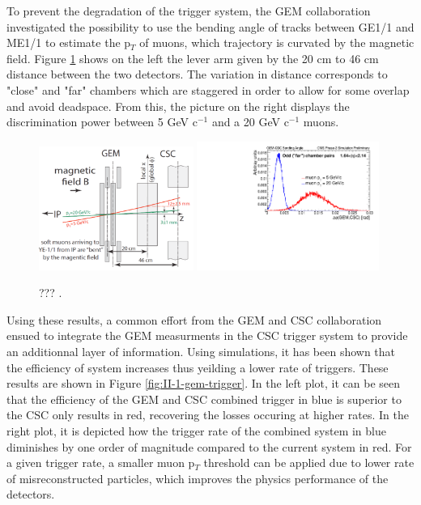     To prevent the degradation of the trigger system, the GEM collaboration investigated the possibility to use the bending angle of tracks between GE1/1 and ME1/1 to estimate the p$_T$ of muons, which trajectory is curvated by the magnetic field. Figure \ref{fig:II-1-gem-csc-bending} shows on the left the lever arm given by the 20 cm to 46 cm distance between the two detectors. The variation in distance corresponds to "close" and "far" chambers which are staggered in order to allow for some overlap and avoid deadspace. From this, the picture on the right displays the discrimination power between 5 GeV c$^{-1}$ and a 20 GeV c$^{-1}$ muons. \\

    \begin{figure}[h!]
      \centering
      \includegraphics[width=0.45\textwidth]{img/II-1-gem/gem-csc-bending-1.png}
      \includegraphics[width=0.53\textwidth]{img/II-1-gem/gem-csc-bending-2.pdf}
      \caption{??? \cite{Colaleo:2021453}.}
      \label{fig:II-1-gem-csc-bending}
    \end{figure}

    Using these results, a common effort from the GEM and CSC collaboration ensued to integrate the GEM measurments in the CSC trigger system to provide an additionnal layer of information. Using simulations, it has been shown that the efficiency of system increases thus yeilding a lower rate of triggers. These results are shown in Figure \ref{fig:II-1-gem-trigger}. In the left plot, it can be seen that the efficiency of the GEM and CSC combined trigger in blue is superior to the CSC only results in red, recovering the losses occuring at higher rates. In the right plot, it is depicted how the trigger rate of the combined system in blue diminishes by one order of magnitude compared to the current system in red. For a given trigger rate, a smaller muon p$_T$ threshold can be applied due to lower rate of misreconstructed particles, which improves the physics performance of the detectors. \\

